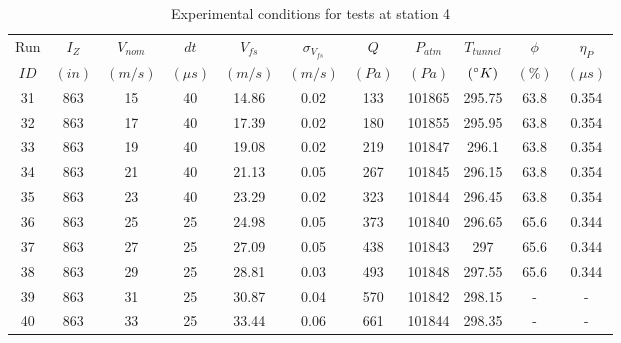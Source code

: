 \begin{table}[H]
\begin{center}
\begin{tabular}{|ccccccccccc|}
	\hline
	Run & $I_Z$ & $V_{nom}$ & $dt$ & $V_{fs}$ & $\sigma_{V_{fs}}$ & $Q$ & $P_{atm}$ & $T_{tunnel}$ & $\phi$ & $\eta_P$\\
	$ID$ & $(in)$ & $(m/s)$ & $(\mu s)$ & $(m/s)$ & $(m/s)$ & $(Pa)$ & $(Pa)$ & $(\degree K)$ & $(\%)$ & $(\mu s)$\\
	\hline
	31 & 863 & 15 & 40 & 14.86 & 0.02 & 133 & 101865 & 295.75 & 63.8 & 0.354\\
	32 & 863 & 17 & 40 & 17.39 & 0.02 & 180 & 101855 & 295.95 & 63.8 & 0.354\\
	33 & 863 & 19 & 40 & 19.08 & 0.02 & 219 & 101847 & 296.1 & 63.8 & 0.354\\
	34 & 863 & 21 & 40 & 21.13 & 0.05 & 267 & 101845 & 296.15 & 63.8 & 0.354\\
	35 & 863 & 23 & 40 & 23.29 & 0.02 & 323 & 101844 & 296.45 & 63.8 & 0.354\\
	36 & 863 & 25 & 25 & 24.98 & 0.05 & 373 & 101840 & 296.65 & 65.6 & 0.344\\
	37 & 863 & 27 & 25 & 27.09 & 0.05 & 438 & 101843 & 297 & 65.6 & 0.344\\
	38 & 863 & 29 & 25 & 28.81 & 0.03 & 493 & 101848 & 297.55 & 65.6 & 0.344\\
	39 & 863 & 31 & 25 & 30.87 & 0.04 & 570 & 101842 & 298.15 & - & -\\
	40 & 863 & 33 & 25 & 33.44 & 0.06 & 661 & 101844 & 298.35 & - & -\\
	\hline
\end{tabular}
\caption{Experimental conditions for tests at station 4}
\label{table:station_4_measurements}
\end{center}
\end{table}
